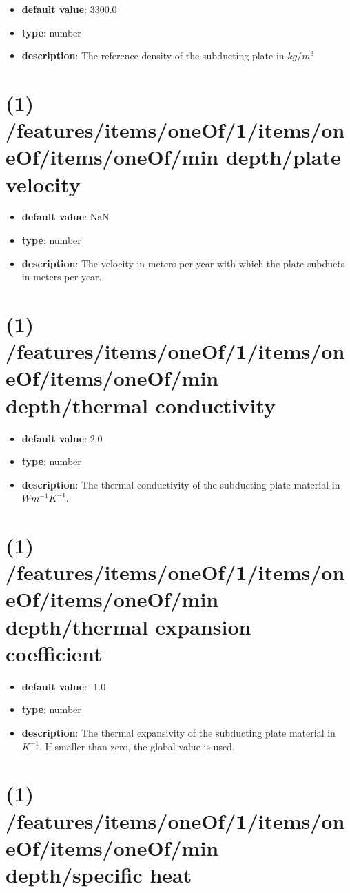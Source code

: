 \begin{itemize}[leftmargin=1em]\item {\bf default value}: 3300.0
\item {\bf type}: number
\item {\bf description}: The reference density of the subducting plate in $kg/m^3$
\end{itemize}\section{(1) /features/items/oneOf/1/items/oneOf/items/oneOf/min depth/plate velocity}
\begin{itemize}[leftmargin=1em]\item {\bf default value}: NaN
\item {\bf type}: number
\item {\bf description}: The velocity in meters per year with which the plate subducts in meters per year.
\end{itemize}\section{(1) /features/items/oneOf/1/items/oneOf/items/oneOf/min depth/thermal conductivity}
\begin{itemize}[leftmargin=1em]\item {\bf default value}: 2.0
\item {\bf type}: number
\item {\bf description}: The thermal conductivity of the subducting plate material in $W m^{-1} K^{-1}$.
\end{itemize}\section{(1) /features/items/oneOf/1/items/oneOf/items/oneOf/min depth/thermal expansion coefficient}
\begin{itemize}[leftmargin=1em]\item {\bf default value}: -1.0
\item {\bf type}: number
\item {\bf description}: The thermal expansivity of the subducting plate material in $K^{-1}$. If smaller than zero, the global value is used.
\end{itemize}\section{(1) /features/items/oneOf/1/items/oneOf/items/oneOf/min depth/specific heat}
